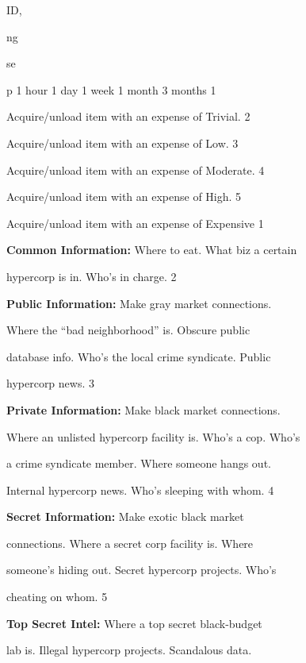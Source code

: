 ID, 

ng 

se 

p 
1 hour
1 day
1 week
1 month
3 months
1

Acquire/unload item with an expense of Trivial.
2

Acquire/unload item with an expense of Low.
3

Acquire/unload item with an expense of Moderate.
4

Acquire/unload item with an expense of High.
5

Acquire/unload item with an expense of Expensive
1

\textbf{Common Information:} Where to eat. What biz a certain 

hypercorp is in. Who's in charge.
2

\textbf{Public Information:} Make gray market connections. 

Where the ``bad neighborhood'' is. Obscure public 

database info. Who's the local crime syndicate. Public 

hypercorp news.
3

\textbf{Private Information:} Make black market connections. 

Where an unlisted hypercorp facility is. Who's a cop. Who's 

a crime syndicate member. Where someone hangs out. 

Internal hypercorp news. Who's sleeping with whom.
4

\textbf{Secret Information:} Make exotic black market 

connections. Where a secret corp facility is. Where 

someone's hiding out. Secret hypercorp projects. Who's 

cheating on whom.
5

\textbf{Top Secret Intel: }Where a top secret black-budget 

lab is. Illegal hypercorp projects. Scandalous data. 

